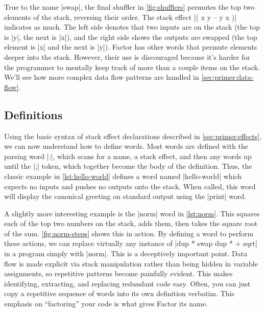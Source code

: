 True to the name \factor|swap|, the final shuffler in \cref{fig:shufflers}
permutes the top two elements of the stack, reversing their order.  The stack
effect
%
\factor|( x y -- y x )|
%
indicates as much.  The left side denotes that two inputs are on the stack (the
top is \factor|y|, the next is \factor|x|), and the right side shows the
outputs are swapped (the top element is \factor|x| and the next is \factor|y|).
Factor has other words that permute elements deeper into the stack.  However,
their use is discouraged because it's harder for the programmer to mentally
keep track of more than a couple items on the stack.  We'll see how more
complex data flow patterns are handled in \cref{sec:primer:data-flow}.

\subsection{Definitions}\label{sec:primer:colon-defs}



Using the basic syntax of stack effect declarations described in
\cref{sec:primer:effects}, we can now understand how to define words.  Most
words are defined with the parsing word \factor|:|, which scans for a name, a
stack effect, and then any words up until the \factor|;| token, which together
become the body of the definition.  Thus, the classic example in
\cref{lst:hello-world} defines a word named \factor|hello-world| which expects
no inputs and pushes no outputs onto the stack.  When called, this word will
display the canonical greeting on standard output using the \factor|print|
word.


A slightly more interesting example is the \factor|norm| word in
\cref{lst:norm}.  This squares each of the top two numbers on the stack, adds
them, then takes the square root of the sum.  \cref{fig:norm-steps} shows this
in action.  By defining a word to perform these actions, we can replace
virtually any instance of
%
\factor|dup * swap dup * + sqrt|
%
in a program simply with \factor|norm|.  This is a deceptively important point.
Data flow is made explicit via stack manipulation rather than being hidden in
variable assignments, so repetitive patterns become painfully evident.  This
makes identifying, extracting, and replacing redundant code easy.  Often, you
can just copy a repetitive sequence of words into its own definition verbatim.
This emphasis on ``factoring'' your code is what gives Factor its name.

